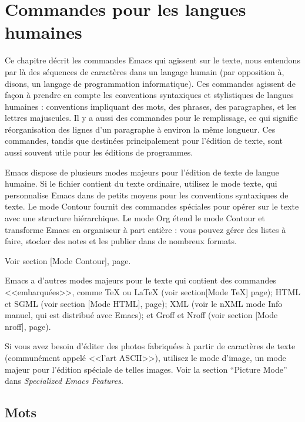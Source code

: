 \chapter{Commandes pour les langues humaines}

Ce chapitre décrit les commandes Emacs qui agissent sur le texte, nous
entendons par là des séquences de caractères dans un langage humain
(par opposition à, disons, un langage de programmation
informatique). Ces commandes agissent de façon à prendre en compte les
conventions syntaxiques et stylistiques de langues humaines :
conventions impliquant des mots, des phrases, des paragraphes, et les
lettres majuscules. Il y a aussi des commandes pour le remplissage, ce
qui signifie réorganisation des lignes d'un paragraphe à environ la
même longueur. Ces commandes, tandis que destinées principalement pour
l'édition de texte, sont aussi souvent utile pour les éditions de
programmes.

Emacs dispose de plusieurs modes majeurs pour l'édition de texte de
langue humaine. Si le fichier contient du texte ordinaire, utilisez le
mode texte, qui personnalise Emacs dans de petits moyens pour les
conventions syntaxiques de texte. Le mode Contour fournit des
commandes spéciales pour opérer sur le texte avec une structure
hiérarchique. Le mode Org étend le mode Contour et transforme Emacs en
organiseur à part entière : vous pouvez gérer des listes à faire,
stocker des notes et les publier dans de nombreux formats. 

Voir section [Mode Contour], page.

Emacs a d'autres modes majeurs pour le texte qui contient des
commandes <<embarquées>>, comme \TeX{} ou \LaTeX{} (voir
section[Mode \TeX{}] page); HTML et SGML
(voir section [Mode HTML], page); XML
(voir le nXML mode Info manuel, qui est distribué avec Emacs); et
Groff et Nroff (voir section [Mode nroff],
page).

Si vous avez besoin d'éditer des photos fabriquées à partir de
caractères de texte (communément appelé <<l'art ASCII>>), utilisez le
mode d'image, un mode majeur pour l'édition spéciale de telles
images. Voir la section ``Picture Mode'' dans \textit{Specialized
  Emacs Features}.

\section{Mots}

